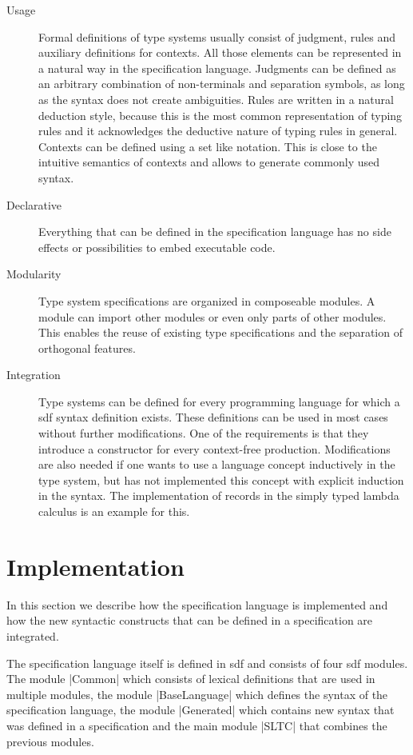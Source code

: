 \begin{description}
\item[Usage] Formal definitions of type systems usually consist of
  judgment, rules and auxiliary definitions for contexts. All those
  elements can be represented in a natural way in the specification
  language. Judgments can be defined as an arbitrary combination of
  non-terminals and separation symbols, as long as the syntax does not
  create ambiguities. Rules are written in a natural deduction style,
  because this is the most common representation of typing rules and
  it acknowledges the deductive nature of typing rules in
  general. Contexts can be defined using a set like notation. This is
  close to the intuitive semantics of contexts and allows to generate
  commonly used syntax.
\item[Declarative] Everything that can be defined in the specification
  language has no side effects or possibilities to embed executable
  code.
\item[Modularity] Type system specifications are organized in
  composeable modules. A module can import other modules or even only
  parts of other modules. This enables the reuse of existing type
  specifications and the separation of orthogonal features.
\item[Integration] Type systems can be defined for every programming
  language for which a \gls{sdf} syntax definition exists. These
  definitions can be used in most cases without further
  modifications. One of the requirements is that they introduce a
  constructor for every context-free production. Modifications are
  also needed if one wants to use a language concept inductively in
  the type system, but has not implemented this concept with explicit
  induction in the syntax. The implementation of records in the simply
  typed lambda calculus is an example for this. 
\end{description}
\section{Implementation}
\label{sec:generate-sdf}
In this section we describe how the specification language is
implemented and how the new syntactic constructs that can be defined
in a specification are integrated.

The specification language itself is defined in \gls{sdf} and consists
of four \gls{sdf} modules. The module \code|Common| which consists of
lexical definitions that are used in multiple modules, the module
\code|BaseLanguage| which defines the syntax of the specification
language, the module \code|Generated| which contains new syntax that
was defined in a specification and the main module \code|SLTC| that
combines the previous modules.

